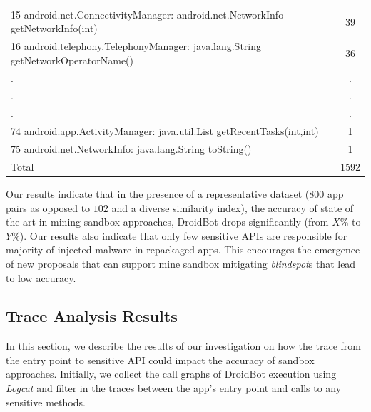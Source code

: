 \begin{table}[t]
\begin{small}
\begin{tabular}{lc}
   15 android.net.ConnectivityManager: android.net.NetworkInfo getNetworkInfo(int) &  39 \\
   16 android.telephony.TelephonyManager: java.lang.String getNetworkOperatorName() &  36 \\
   .&  .\\
   .&  .\\
   .&  .\\
   74 android.app.ActivityManager: java.util.List getRecentTasks(int,int) & 1 \\
   75 android.net.NetworkInfo: java.lang.String toString() & 1 \\

 \bottomrule
                            Total & 1592 \\

 \end{tabular}
 \end{small}
 \label{tab:APIused}
\end{table}

\begin{obs}{1}{}
   Our results indicate that in the presence of a representative dataset ($800$ app pairs as opposed to $102$ and a diverse similarity index), the accuracy of state of the art in mining sandbox approaches, DroidBot drops significantly (from $X\%$ to $Y\%$). Our results also indicate that only few sensitive APIs are responsible for majority of injected malware in repackaged apps. This encourages the emergence of new proposals that can support mine sandbox mitigating \textit{blindspot}s that lead to low accuracy.
 \end{obs}



\subsection{Trace Analysis Results}\label{sec:traceResults}

In this section, we describe the results of our investigation on how the trace from the entry point to sensitive API could impact the accuracy of sandbox approaches. Initially, we collect the call graphs of DroidBot execution using \emph{Logcat} and filter in the traces between the app's entry point and calls to any sensitive methods.

